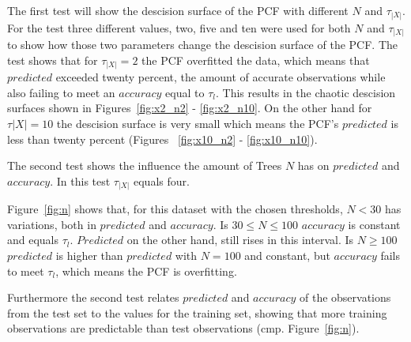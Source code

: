 The first test will show the descision surface of the PCF
with different $N$ and $\tau_{|X|}$. For the test three
different values, two, five and ten were used for both $N$
and $\tau_{|X|}$ to show how those two parameters change
the descision surface of the PCF. The test shows that for
$\tau_{|X|} = 2$ the PCF overfitted the data, which means
that $predicted$ exceeded twenty percent, the amount of
accurate observations while also failing to meet an
$accuracy$ equal to $\tau_l$. This results in the chaotic
descision surfaces shown in Figures~\ref{fig:x2_n2} -
\ref{fig:x2_n10}. On the other hand for $\tau{|X|} = 10$
the descision surface is very small which means the PCF's
$predicted$ is less than twenty percent (Figures~%
\ref{fig:x10_n2} - \ref{fig:x10_n10}).

The second test shows the influence the amount of Trees $N$
has on $predicted$ and $accuracy$. In this test
$\tau_{|X|}$ equals four.

Figure~\ref{fig:n} shows that, for this dataset with the
chosen thresholds, $N < 30$ has variations, both in
$predicted$ and $accuracy$. Is $30 \leq N \leq 100$
$accuracy$ is constant and equals $\tau_l$. $Predicted$ on
the other hand, still rises in this interval. Is
$N \geq 100$ $predicted$ is higher than $predicted$ with
$N = 100$ and constant, but $accuracy$ fails to meet
$\tau_l$, which means the PCF is overfitting.

Furthermore the second test relates $predicted$ and
$accuracy$ of the observations from the test set to the
values for the training set, showing that more training
observations are predictable than test observations
(cmp. Figure~\ref{fig:n}).






